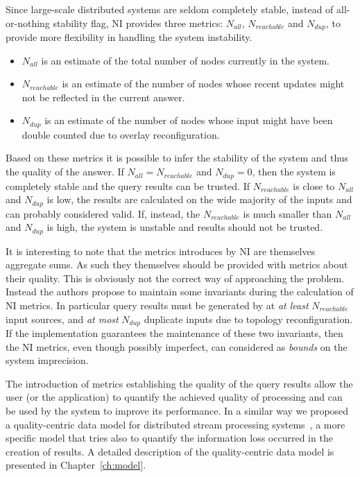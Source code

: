 Since large-scale distributed systems are seldom completely stable, instead of all-or-nothing stability flag, NI provides three 
metrics: $N_{all}$, $N_{reachable}$ and $N_{dup}$, to provide more flexibility in handling the system instability.
\begin{itemize}
	\item $N_{all}$ is an estimate of the total number of nodes currently in the system.
	\item $N_{reachable}$ is an estimate of the number of nodes whose recent updates might not be reflected in the
current answer.
	\item $N_{dup}$ is an estimate of the number of nodes whose input might have been double counted due to overlay
reconfiguration.
\end{itemize}
Based on these metrics it is possible to infer the stability of the system and thus the quality of the answer. If
$N_{all} = N_{reachable}$ and $N_{dup} = 0$, then the system is completely stable and the query results can be trusted. 
If $N_{reachable}$ is close to $N_{all}$ and $N_{dup}$ is low, the results are calculated on the wide majority of the
inputs and can probably considered valid. If, instead, the $N_{reachable}$ is much smaller than $N_{all}$ and $N_{dup}$
is high, the system is unstable and results should not be trusted.

It is interesting to note that the metrics introduces by NI are themselves aggregate sums. As such they themselves
should be provided with metrics about their quality. This is obviously not the correct way of approaching the problem.
Instead the authors propose to maintain some invariants during the calculation of NI metrics. In particular query
results must be generated by at \emph{at least} $N_{reachable}$ input sources, and \emph{at most} $N_{dup}$ duplicate
inputs due to topology reconfiguration. If the implementation guarantees the maintenance of these two invariants, then
the NI metrics, even though possibly imperfect, can considered as \emph{bounds} on the system imprecision.

The introduction of metrics establishing the quality of the query results allow the user (or the application) to
quantify the achieved quality of processing and can be used by the system to improve its performance. In a similar way we
proposed a quality-centric data model for distributed stream processing systems~\cite{dissp-qdb2009}, a more specific
model that tries also to quantify the information loss occurred in the creation of results. A detailed description of the
quality-centric data model is presented in Chapter~\ref{ch:model}. 





%

